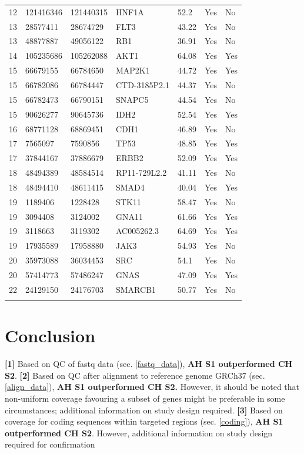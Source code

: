\documentclass{article}
\begin{document}
\begin{center}
\begin{longtable}{ l l l l l l l}
12 & 121416346 & 121440315 & HNF1A & 52.2 & Yes & No \\
13 & 28577411 & 28674729 & FLT3 & 43.22 & Yes & No \\
13 & 48877887 & 49056122 & RB1 & 36.91 & Yes & No \\
14 & 105235686 & 105262088 & AKT1 & 64.08 & Yes & Yes \\
15 & 66679155 & 66784650 & MAP2K1 & 44.72 & Yes & Yes \\
15 & 66782086 & 66784447 & CTD-3185P2.1 & 44.37 & Yes & No \\
15 & 66782473 & 66790151 & SNAPC5 & 44.54 & Yes & No \\
15 & 90626277 & 90645736 & IDH2 & 52.54 & Yes & Yes \\
16 & 68771128 & 68869451 & CDH1 & 46.89 & Yes & No \\
17 & 7565097 & 7590856 & TP53 & 48.85 & Yes & Yes \\
17 & 37844167 & 37886679 & ERBB2 & 52.09 & Yes & Yes \\
18 & 48494389 & 48584514 & RP11-729L2.2 & 41.11 & Yes & No \\
18 & 48494410 & 48611415 & SMAD4 & 40.04 & Yes & Yes \\
19 & 1189406 & 1228428 & STK11 & 58.47 & Yes & No \\
19 & 3094408 & 3124002 & GNA11 & 61.66 & Yes & Yes \\
19 & 3118663 & 3119302 & AC005262.3 & 64.69 & Yes & Yes \\
19 & 17935589 & 17958880 & JAK3 & 54.93 & Yes & No \\
20 & 35973088 & 36034453 & SRC & 54.1 & Yes & No \\
20 & 57414773 & 57486247 & GNAS & 47.09 & Yes & Yes \\
22 & 24129150 & 24176703 & SMARCB1 & 50.77 & Yes & No \\
\hline
\label{table:2}
\end{longtable}
\end{center}

\section{Conclusion}
\label{conclusion}
\textbf{[1]} Based on QC of fastq data (sec. \ref{fastq_data}), \textbf{AH S1 outperformed CH S2}.
\textbf{[2]} Based on QC after alignment to reference genome GRCh37 (sec. \ref{align_data}), 
\textbf{AH S1 outperformed CH S2.} 
However, it should be noted that non-uniform coverage favouring a subset of genes might be preferable
in some circumstances;  additional information on study design required.
\textbf{[3]} Based on coverage for coding sequences within targeted regions (sec. \ref{coding}), \textbf{AH S1 outperformed CH S2}. 
However, additional information on study design required for confirmation
\end{document}
